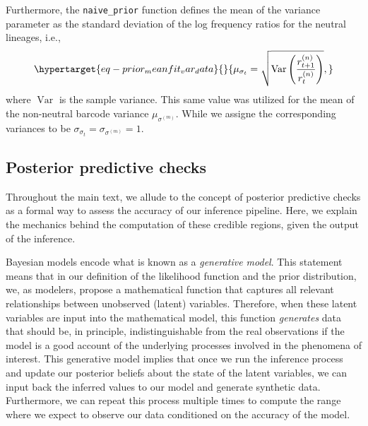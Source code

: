 \documentclass[
]{scrartcl}
\begin{document}
\begin{refsegment}
Furthermore, the \texttt{naive\_prior} function defines the mean of the
variance parameter as the standard deviation of the log frequency ratios
for the neutral lineages, i.e.,
\begin{equation}\protect\hypertarget{eq-prior_meanfit_var_data}{}{
\mu_{\sigma_t} = \sqrt{
    \operatorname{Var}\left(\frac{r_{t+1}^{(n)}}{r_t^{(n)}}\right)
},
}\label{eq-prior_meanfit_var_data}\end{equation} where
\(\operatorname{Var}\) is the sample variance. This same value was
utilized for the mean of the non-neutral barcode variance
\(\mu_{\sigma^{(m)}}\). While we assigne the corresponding variances to
be \(\sigma_{\sigma_t} = \sigma_{\sigma^{(m)}} = 1\).

\hypertarget{sec-ppc}{%
\subsection{Posterior predictive checks}\label{sec-ppc}}

Throughout the main text, we allude to the concept of posterior
predictive checks as a formal way to assess the accuracy of our
inference pipeline. Here, we explain the mechanics behind the
computation of these credible regions, given the output of the
inference.

Bayesian models encode what is known as a \emph{generative model}. This
statement means that in our definition of the likelihood function and
the prior distribution, we, as modelers, propose a mathematical function
that captures all relevant relationships between unobserved (latent)
variables. Therefore, when these latent variables are input into the
mathematical model, this function \emph{generates} data that should be,
in principle, indistinguishable from the real observations if the model
is a good account of the underlying processes involved in the phenomena
of interest. This generative model implies that once we run the
inference process and update our posterior beliefs about the state of
the latent variables, we can input back the inferred values to our model
and generate synthetic data. Furthermore, we can repeat this process
multiple times to compute the range where we expect to observe our data
conditioned on the accuracy of the model.


\end{refsegment}
\end{document}
